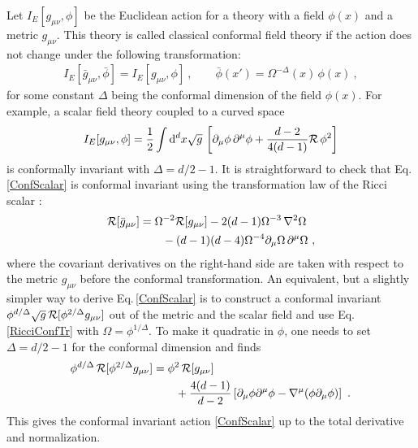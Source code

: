 Let $I_E[g_{\mu\nu}, \phi ]$ be the Euclidean action for a theory with a field $\phi(x)$ and a metric $g_{\mu\nu}$.
This theory is called classical conformal field theory if the action does not change under the following transformation:
\begin{align}
	I_E[\bar g_{\mu\nu}, \bar \phi ] =  I_E[ g_{\mu\nu}, \phi ] \ ,\qquad \bar \phi(x') = \Omega^{-\Delta} (x)\, \phi(x) \ ,
\end{align}
for some constant $\Delta$ being the conformal dimension of the field $\phi(x)$.
For example, a scalar field theory coupled to a curved space 
\begin{align}\label{ConfScalar}
	I_E[g_{\mu\nu}, \phi ] = \frac{1}{2} \int \mathrm{d}^d x \sqrt{g}\, \left[ \partial_\mu\phi\, \partial^\mu \phi + \frac{d-2}{4(d-1)} {\cal R}\, \phi^2 \right] 
\end{align}
is conformally invariant with $\Delta = d/2 -1$.
It is straightforward to check that Eq.\,\eqref{ConfScalar} is conformal invariant  using the transformation law of the Ricci scalar \cite{Birrell:1982ix}:
\begin{align}\label{RicciConfTr}
\begin{aligned}
	{\cal R} [\bar g_{\mu\nu}] &= \Omega^{-2} {\cal R}[g_{\mu\nu}] - 2(d-1)\Omega^{-3}\,\nabla^2\Omega \\
		&\qquad - (d-1)(d-4)\Omega^{-4} \partial_\mu\Omega\, \partial^\mu\Omega \ ,
\end{aligned}
\end{align}
where the covariant derivatives on the right-hand side are taken with respect to the metric $g_{\mu\nu}$ before the conformal transformation.
An equivalent, but a slightly simpler way to derive Eq.\,\eqref{ConfScalar} is to construct a conformal invariant $\phi^{d/\Delta} \sqrt{g} \,{\cal R}[\phi^{2/\Delta}g_{\mu\nu}]$ out of the metric and the scalar field and use Eq.\,\eqref{RicciConfTr} with $\Omega = \phi^{1/\Delta}$.
To make it quadratic in $\phi$, one needs to set $\Delta = d/2 - 1$ for the conformal dimension \cite{Brown:1976wc} and finds
\begin{align}
\begin{aligned}
	\phi^{d/\Delta} \,{\cal R}[\phi^{2/\Delta}g_{\mu\nu}] &= \phi^2\, {\cal R}[g_{\mu\nu}] \\
		&\qquad + \frac{4(d-1)}{d-2}\left[ \partial_\mu \phi \partial^\mu\phi - \nabla^\mu (\phi \partial_\mu \phi)\right] \ .
\end{aligned}
\end{align}
This gives the conformal invariant action \eqref{ConfScalar} up to the total derivative and normalization.

